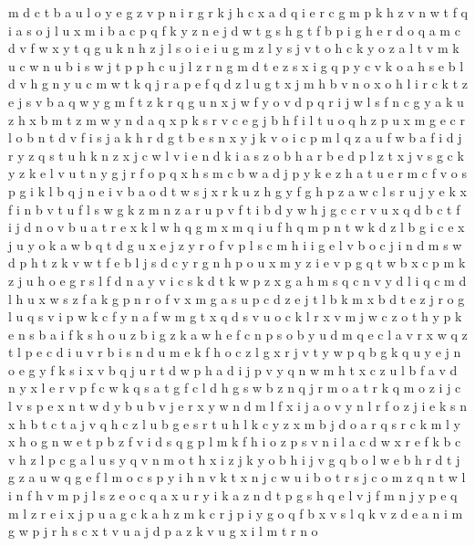 \documentclass{article}
\begin{document}
m d c t b a u l o y e g z v p n i r
g r k j h c x a d q i
e r c g m p k h z v n w t f q i a s o j l u
x m i b a c p q f k y z n e j d w t g s h
g t f
b p i g h e r d o q
a m c d v f w x y t q g u k n h z j l s o i e
i u g m z l y s j v t o h c k
y o z a l t v m k u c w n
u b i
s w j t p
p h c u j l z r n g
m d t e z s x i g q p y c v k o a h
s e b l d v h g n y u c m w t k q j r
a p e f q d z l u g t x j m h b v n o
x o h l i r c k t z e j s v b a q w y g m f
t z k r q g u n x j w f y
o v d p q r i j w l s f n c g y a k u z h x b m t
z m w y n d a q x p k s r v c e g j b h f i l t u o
q h z p u x m g e c r l o b n t d v f i s j a k
h r d g t b e s n x y j k v o i c p m l q z a u f
w b a f i d j r y z q s t u h k n
z x j c w l v i e
n d k i a s z o b
h a r b e d p l z t x j v s g c k y
z k e l v u t n y g j r f o p q x h s m c b w a d
j p y k e
z h a t u e r m c f v o s p g i k l b q j
n e i v b a o d t w s j x r k u z h g y f
g h p z a w c l s r u j y e k x f i n b v
t u f l s
w g k z
m n z a r u p v f t i b d y w h j g c
c
r v u x q d b c t f i
j d n o v b u a t r e x k l w h q g m
x m q i u f h
q m p n t w k d z l b g i c e x j u y o
k a w b q t d g u x e j z y r o f v p l s c m h i
i g e l v b o
c j i n d
m s w d p h t
z k v w t f e b l j s d c y r g n h p o u x m
y z i e v p g
q t w b x c p m k z j u h o e g r s l f d n a y v i
c s k d t
k w p z x g a h m s q c n v y d l
i q c m d l h u x w s z f a k g p n r
o f v x m g a s u p c d z e j t l b k
m x b d t e z j r o g l u q s v i p w k c f y n a
f w m g t x q d s v u o c k l r
x v m j w c z o t h y p k e n s b a i f
k s h o u z b
i g z k a w h e f c n p s o b y u d m
q e c l a v r x
w q z t l p e c d i u v r b
i s n d u m e k f h o c z l g x r j v t y w p q b
g k q u y e j
n o e g y f k s i x v b q j u r t d w p h a
d i j p v y q n w m h t x c z u l b
f a v
d n y x l e r v p f c w k q s a t g
f c l d h g s w b z n q j r m o a t
r k q m o z i j c l v s p e x n t w d y b u
b v j e r x y w n
d m l f x i j a o v y n
l r f o z j i e k s n x h b t c
t a j v q h c z l u b g e s r
t u h l k c y z x m b j d o a r q s
r c k m l y x h o g n w e t p b z f v i d s
q g
p l m k f h i
o z p s v n i l a c d w x r e f
k b c v h z l p
c g a l u s y q v n m o t h x i z j k
y o b
h
i j v g q b
o l w e b h r d t j g z
a u w q g e f l m o c s p y i h n v k t
x n j c w u i b o t r s
j c o m z q n t w l
i n f h v m p j l s z e o c q a
x u r y i k a z n d t p g s h q e l v j f m
n j y p e q m l
z r e i x j p u a g c k
a h z m k c r j p i y g o q f b x v s l
q k v z d e a n i m g w p j r h s c x t
v u
a
j d p a z k v u g x i l m t r n o
\end{document}
